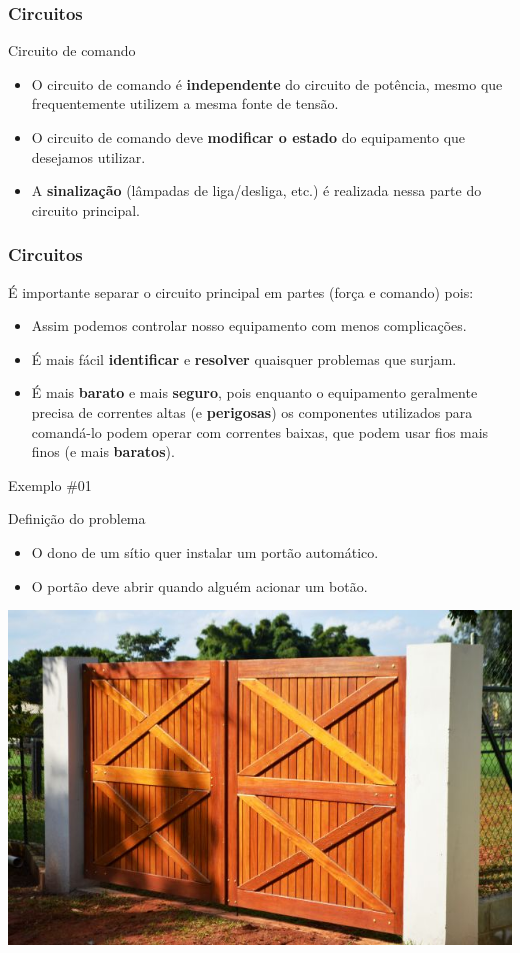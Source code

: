 \begin{frame}
\frametitle{Circuitos}
\begin{block}{Circuito de comando}
	\begin{itemize}
		\item O circuito de comando é \textbf{independente} do circuito de potência, mesmo que frequentemente utilizem a mesma fonte de tensão.
		\item O circuito de comando deve \textbf{modificar o estado} do equipamento que desejamos utilizar.
		\item A \textbf{sinalização} (lâmpadas de liga/desliga, etc.) é realizada nessa parte do circuito principal.
	\end{itemize}
\end{block}
\end{frame}

\begin{frame}
\frametitle{Circuitos}
\begin{block}{}
	É importante separar o circuito principal em partes (força e comando) pois:
	\begin{itemize}
		\item Assim podemos controlar nosso equipamento com menos complicações.
		\item É mais fácil \textbf{identificar} e \textbf{resolver} quaisquer problemas que surjam.
		\item É mais \textbf{barato} e mais \textbf{seguro}, pois enquanto o equipamento geralmente precisa de correntes altas (e \textbf{perigosas}) os componentes utilizados para comandá-lo podem operar com correntes baixas, que podem usar fios mais finos (e mais \textbf{baratos}).
	\end{itemize}
\end{block}
\end{frame}

\begin{frame}{Exemplo \#01}
\begin{block}{Definição do problema}
	\begin{itemize}
		\item O dono de um sítio quer instalar um portão automático.
		\item O portão deve abrir quando alguém acionar um botão.
	\end{itemize}
\end{block}
\centerline{\includegraphics[width=0.7\linewidth]{Figuras/Ch05/fig5.jpg}}
\end{frame}

